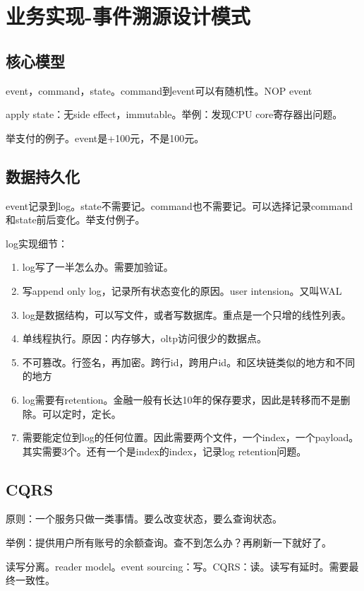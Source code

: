 \chapter{业务实现-事件溯源设计模式}


\section{核心模型}
event，command，state。command到event可以有随机性。NOP event

apply state：无side effect，immutable。举例：发现CPU core寄存器出问题。

举支付的例子。event是+100元，不是100元。


\section{数据持久化}

event记录到log。state不需要记。command也不需要记。可以选择记录command和state前后变化。举支付例子。

log实现细节：
\begin{enumerate}
    \item log写了一半怎么办。需要加验证。
    \item 写append only log，记录所有状态变化的原因。user intension。又叫WAL
    \item log是数据结构，可以写文件，或者写数据库。重点是一个只增的线性列表。
    \item 单线程执行。原因：内存够大，oltp访问很少的数据点。
    \item 不可篡改。行签名，再加密。跨行id，跨用户id。和区块链类似的地方和不同的地方
    \item log需要有retention。金融一般有长达10年的保存要求，因此是转移而不是删除。可以定时，定长。
    \item 需要能定位到log的任何位置。因此需要两个文件，一个index，一个payload。其实需要3个。还有一个是index的index，记录log retention问题。
\end{enumerate}




\section{CQRS}

原则：一个服务只做一类事情。要么改变状态，要么查询状态。

举例：提供用户所有账号的余额查询。查不到怎么办？再刷新一下就好了。

读写分离。reader model。event sourcing：写。CQRS：读。读写有延时。需要最终一致性。

